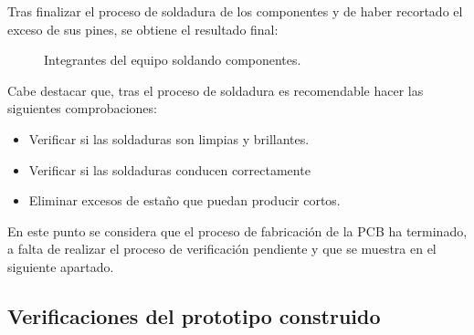 \begin{enumerate}
    Tras finalizar el proceso de soldadura de los componentes y de haber recortado el exceso de sus pines, se obtiene el resultado final:


    \begin{figure}[H]
    \centering
    \hfill
    \caption{Integrantes del equipo soldando componentes.}
    \end{figure}
    
    Cabe destacar que, tras el proceso de soldadura es recomendable hacer las siguientes comprobaciones:
    \begin{itemize}
        \item Verificar si las soldaduras son limpias y brillantes.
        \item Verificar si las soldaduras conducen correctamente
        \item Eliminar excesos de estaño que puedan producir cortos.
    \end{itemize}
\end{enumerate}

En este punto se considera que el proceso de fabricación de la \ac{PCB} ha terminado, a falta de realizar el proceso de verificación pendiente y que se muestra en el siguiente apartado.

\subsection{Verificaciones del prototipo construido}

